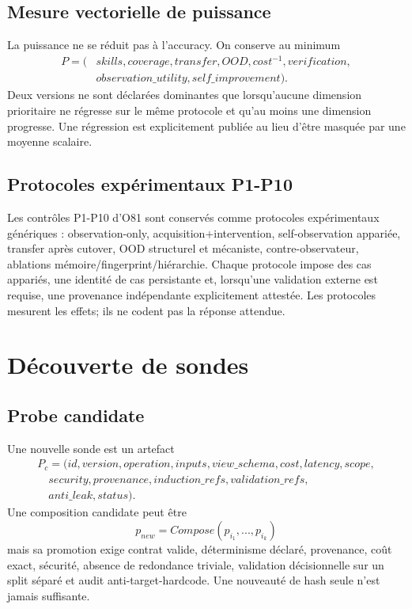 \documentclass[11pt,a4paper]{report}
\begin{document}
\section{Mesure vectorielle de puissance}
La puissance ne se réduit pas à l'accuracy. On conserve au minimum
\[
\begin{aligned}
P=(&skills,coverage,transfer,OOD,cost^{-1},verification,\\
&observation\_utility,self\_improvement).
\end{aligned}
\]
Deux versions ne sont déclarées dominantes que lorsqu'aucune dimension prioritaire ne régresse sur le même protocole et qu'au moins une dimension progresse. Une régression est explicitement publiée au lieu d'être masquée par une moyenne scalaire.

\section{Protocoles expérimentaux P1-P10}
Les contrôles P1-P10 d'O81 sont conservés comme protocoles expérimentaux génériques : observation-only, acquisition+intervention, self-observation appariée, transfer après cutover, OOD structurel et mécaniste, contre-observateur, ablations mémoire/fingerprint/hiérarchie. Chaque protocole impose des cas appariés, une identité de cas persistante et, lorsqu'une validation externe est requise, une provenance indépendante explicitement attestée. Les protocoles mesurent les effets; ils ne codent pas la réponse attendue.

\chapter{Découverte de sondes}
\section{Probe candidate}
Une nouvelle sonde est un artefact
\[
\begin{aligned}
P_c=(id,version,operation,inputs,view\_schema,cost,latency,scope,\\
\quad security,provenance,induction\_refs,validation\_refs,\\
\quad anti\_leak,status).
\end{aligned}
\]
Une composition candidate peut être
\[
p_{new}=Compose(p_{i_1},...,p_{i_k})
\]
mais sa promotion exige contrat valide, déterminisme déclaré, provenance, coût exact, sécurité, absence de redondance triviale, validation décisionnelle sur un split séparé et audit anti-target-hardcode. Une nouveauté de hash seule n'est jamais suffisante.
\end{document}
